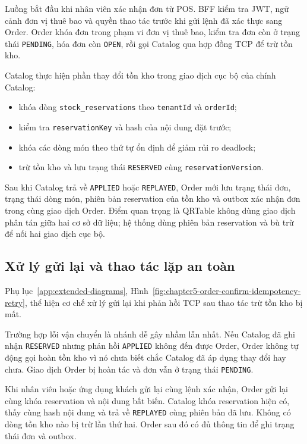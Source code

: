Luồng bắt đầu khi nhân viên xác nhận đơn từ POS. BFF kiểm tra JWT, ngữ cảnh đơn vị thuê bao và quyền thao tác trước khi gửi lệnh đã xác thực sang Order. Order khóa đơn trong phạm vi đơn vị thuê bao, kiểm tra đơn còn ở trạng thái \texttt{PENDING}, hóa đơn còn \texttt{OPEN}, rồi gọi Catalog qua hợp đồng TCP để trừ tồn kho.

Catalog thực hiện phần thay đổi tồn kho trong giao dịch cục bộ của chính Catalog:

\begin{itemize}
  \item khóa dòng \texttt{stock\_reservations} theo \texttt{tenantId} và \texttt{orderId};
  \item kiểm tra \texttt{reservationKey} và hash của nội dung đặt trước;
  \item khóa các dòng món theo thứ tự ổn định để giảm rủi ro deadlock;
  \item trừ tồn kho và lưu trạng thái \texttt{RESERVED} cùng \texttt{reservationVersion}.
\end{itemize}

Sau khi Catalog trả về \texttt{APPLIED} hoặc \texttt{REPLAYED}, Order mới lưu trạng thái đơn, trạng thái dòng món, phiên bản reservation của tồn kho và outbox xác nhận đơn trong cùng giao dịch Order. Điểm quan trọng là QRTable không dùng giao dịch phân tán giữa hai cơ sở dữ liệu; hệ thống dùng phiên bản reservation và bù trừ để nối hai giao dịch cục bộ.

\subsection{Xử lý gửi lại và thao tác lặp an toàn}

Phụ lục~\ref{app:extended-diagrams}, Hình~\ref{fig:chapter5-order-confirm-idempotency-retry}, thể hiện cơ chế xử lý gửi lại khi phản hồi TCP sau thao tác trừ tồn kho bị mất.

Trường hợp lỗi vận chuyển là nhánh dễ gây nhầm lẫn nhất. Nếu Catalog đã ghi nhận \texttt{RESERVED} nhưng phản hồi \texttt{APPLIED} không đến được Order, Order không tự động gọi hoàn tồn kho vì nó chưa biết chắc Catalog đã áp dụng thay đổi hay chưa. Giao dịch Order bị hoàn tác và đơn vẫn ở trạng thái \texttt{PENDING}.

Khi nhân viên hoặc ứng dụng khách gửi lại cùng lệnh xác nhận, Order gửi lại cùng khóa reservation và nội dung bất biến. Catalog khóa reservation hiện có, thấy cùng hash nội dung và trả về \texttt{REPLAYED} cùng phiên bản đã lưu. Không có dòng tồn kho nào bị trừ lần thứ hai. Order sau đó có đủ thông tin để ghi trạng thái đơn và outbox.


